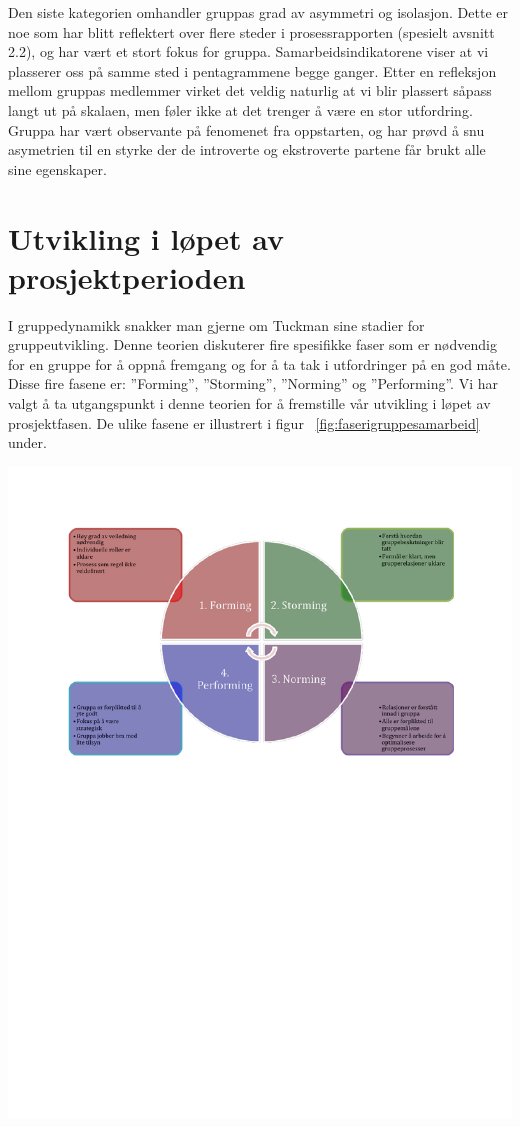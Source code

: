 Den siste kategorien omhandler gruppas grad av asymmetri og isolasjon. Dette er noe som har blitt reflektert over flere steder i prosessrapporten (spesielt avsnitt 2.2), og har vært et stort fokus for gruppa. Samarbeidsindikatorene viser at vi plasserer oss på samme sted i pentagrammene begge ganger. Etter en refleksjon mellom gruppas medlemmer virket det veldig naturlig at vi blir plassert såpass langt ut på skalaen, men føler ikke at det trenger å være en stor utfordring. Gruppa har vært observante på fenomenet fra oppstarten, og har prøvd å snu asymetrien til en styrke der de introverte og ekstroverte partene får brukt alle sine egenskaper.\\


\section{Utvikling i løpet av prosjektperioden}
I gruppedynamikk snakker man gjerne om Tuckman sine stadier for gruppeutvikling. Denne teorien diskuterer fire spesifikke faser som er nødvendig for en gruppe for å oppnå fremgang og for å ta tak i utfordringer på en god måte. Disse fire fasene er: ''Forming'', ''Storming'', ''Norming'' og ''Performing''. Vi har valgt å ta utgangspunkt i denne teorien for å fremstille vår utvikling i løpet av prosjektfasen. De ulike fasene er illustrert i figur ~\ref{fig:faserigruppesamarbeid} under.\\

\begin{center}
\includegraphics[clip=true, width=1 \textwidth,
trim=0cm 0cm 0cm 0cm]{Faserigruppesamarbeid.pdf}
\label{fig:faserigruppesamarbeid}
\end{center}

